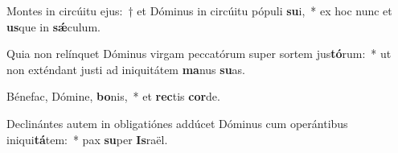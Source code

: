 \item Montes in circúitu ejus:~† et Dóminus in circúitu pópuli \textbf{su}i,~* ex hoc nunc et \textbf{us}que in \textbf{sǽ}culum.
\item Quia non relínquet Dóminus virgam peccatórum super sortem jus\textbf{tó}rum:~* ut non exténdant justi ad iniquitátem \textbf{ma}nus \textbf{su}as.
\item Bénefac, Dómine, \textbf{bo}nis,~* et \textbf{rec}tis \textbf{cor}de.
\item Declinántes autem in obligatiónes addúcet Dóminus cum operántibus iniqui\textbf{tá}tem:~* pax \textbf{su}per \textbf{Is}raël.
